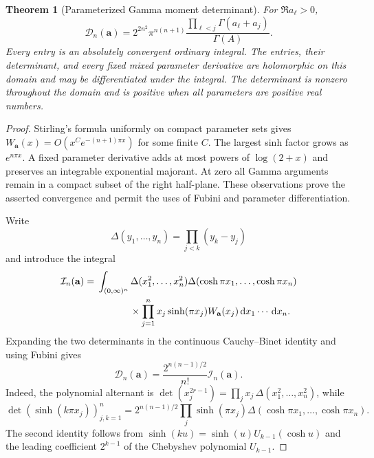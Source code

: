 \documentclass[11pt,a4paper]{article}
\numberwithin{equation}{section}
\newtheorem{theorem}{Theorem}[section]
\theoremstyle{definition}
\theoremstyle{remark}
\newcommand{\dd}{\,\mathrm d}
\begin{document}
\begin{theorem}[Parameterized Gamma moment determinant]
\label{gn:thm:determinant}
For $\Re a_\ell>0$,
\begin{equation}\label{gn:eq:determinant}
 \boxed{\displaystyle
 \mathcal D_n(\mathbf a)
 =2^{2n^2}\pi^{n(n+1)}
       \frac{\prod_{\ell<j}\Gamma(a_\ell+a_j)}{\Gamma(A)}.}
\end{equation}
Every entry is an absolutely convergent ordinary integral.  The entries,
their determinant, and every fixed mixed parameter derivative are
holomorphic on this domain and may be differentiated under the integral.
The determinant is nonzero throughout the domain and is positive when
all parameters are positive real numbers.
\end{theorem}

\begin{proof}
Stirling's formula uniformly on compact parameter sets gives
$W_{\mathbf a}(x)=O(x^C e^{-(n+1)\pi x})$ for some finite $C$.
The largest sinh factor grows as $e^{n\pi x}$.  A fixed parameter
derivative adds at most powers of $\log(2+x)$ and preserves an integrable
exponential majorant.  At zero all Gamma arguments remain in a compact
subset of the right half-plane.  These observations prove the asserted
convergence and permit the uses of Fubini and parameter differentiation.

Write
\[
 \Delta(y_1,\ldots,y_n)=\prod_{j<k}(y_k-y_j)
\]
and introduce the integral
\begin{equation}\label{gn:eq:I}
\begin{split}
 \mathcal I_n(\mathbf a)
 ={}&\int_{(0,\infty)^n}
    \Delta(x_1^2,\ldots,x_n^2)
    \Delta(\cosh\pi x_1,\ldots,\cosh\pi x_n)\\
 &\hspace{12mm}\times
       \prod_{j=1}^n x_j\sinh(\pi x_j)W_{\mathbf a}(x_j)
          \dd x_1\cdots\dd x_n.
\end{split}
\end{equation}
Expanding the two determinants in the continuous Cauchy--Binet identity
and using Fubini gives
\begin{equation}\label{gn:eq:andreief}
 \mathcal D_n(\mathbf a)
      =\frac{2^{n(n-1)/2}}{n!}\mathcal I_n(\mathbf a).
\end{equation}
Indeed, the polynomial alternant is
$\det(x_j^{2r-1})=\prod_jx_j\,\Delta(x_1^2,\ldots,x_n^2)$,
while
\[
 \det(\sinh(k\pi x_j))_{j,k=1}^n
  =2^{n(n-1)/2}\prod_j\sinh(\pi x_j)
                   \Delta(\cosh\pi x_1,\ldots,\cosh\pi x_n).
\]
The second identity follows from
$\sinh(ku)=\sinh(u)U_{k-1}(\cosh u)$ and the leading coefficient
$2^{k-1}$ of the Chebyshev polynomial $U_{k-1}$.


\end{proof}
\end{document}
